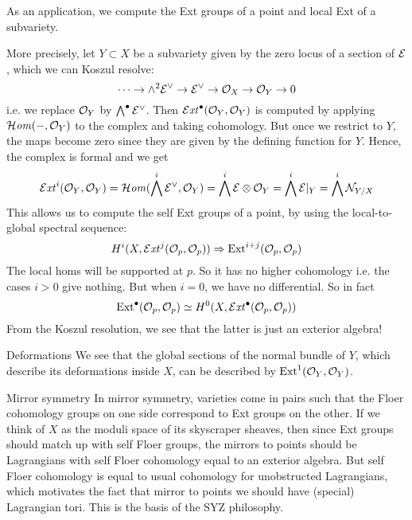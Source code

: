 As an application, we compute the Ext groups of a point and local Ext of a subvariety.

More precisely, let $Y\subset X$ be a subvariety given by the zero locus of a section of $\mathcal{E}$, which we can Koszul resolve:
\begin{equation*}
    \cdots\to\wedge^2\mathcal{E}^\vee\to\mathcal{E}^\vee\to\mathcal{O}_X\to\mathcal{O}_{Y}\to0
\end{equation*}
i.e. we replace $\mathcal{O}_Y$ by $\bigwedge^\bullet\mathcal{E}^\vee$. Then $\operatorname{\mathcal{E}\mathit{xt}}^\bullet(\mathcal{O}_Y,\mathcal{O}_Y)$ is computed by applying $\operatorname{\mathcal{H}\mathit{om}}(-,\mathcal{O}_Y)$ to the complex and taking cohomology. But once we restrict to $Y$, the maps become zero since they are given by the defining function for $Y$. Hence, the complex is formal and we get
\begin{equation*}
    \operatorname{\mathcal{E}\mathit{xt}}^i(\mathcal{O}_Y,\mathcal{O}_Y)
        = \operatorname{\mathcal{H}\mathit{om}}(\bigwedge^i\mathcal{E}^\vee,\mathcal{O}_Y)
        = \bigwedge^i\mathcal{E}\otimes\mathcal{O}_Y
        = \bigwedge^i\mathcal{E}|_Y
        = \bigwedge^i\mathcal{N}_{Y/X}
\end{equation*}
This allows us to compute the self Ext groups of a point, by using the local-to-global spectral sequence:
\begin{equation*}
    H^i(X,\operatorname{\mathcal{E}\mathit{xt}}^j(\mathcal{O}_p,\mathcal{O}_p)) \Rightarrow \operatorname{Ext}^{i+j}(\mathcal{O}_p,\mathcal{O}_p)
\end{equation*}
The local homs will be supported at $p$. So it has no higher cohomology i.e. the cases $i>0$ give nothing. But when $i=0$, we have no differential. So in fact
\begin{equation*}
    \operatorname{Ext}^\bullet(\mathcal{O}_p,\mathcal{O}_p) \simeq H^0(X,\operatorname{\mathcal{E}\mathit{xt}}^\bullet(\mathcal{O}_p,\mathcal{O}_p))
\end{equation*}
From the Koszul resolution, we see that the latter is just an exterior algebra!

\begin{remark}{Deformations}{}
    We see that the global sections of the normal bundle of $Y$, which describe its deformations inside $X$, can be described by $\operatorname{Ext}^1(\mathcal{O}_Y,\mathcal{O}_Y)$.
\end{remark}

\begin{remark}{Mirror symmetry}{}
    In mirror symmetry, varieties come in pairs such that the Floer cohomology groups on one side correspond to Ext groups on the other. If we think of $X$ as the moduli space of its skyscraper sheaves, then since Ext groups should match up with self Floer groups, the mirrors to points should be Lagrangians with self Floer cohomology equal to an exterior algebra. But self Floer cohomology is equal to usual cohomology for unobstructed Lagrangians, which motivates the fact that mirror to points we should have (special) Lagrangian tori. This is the basis of the SYZ philosophy.
\end{remark}

